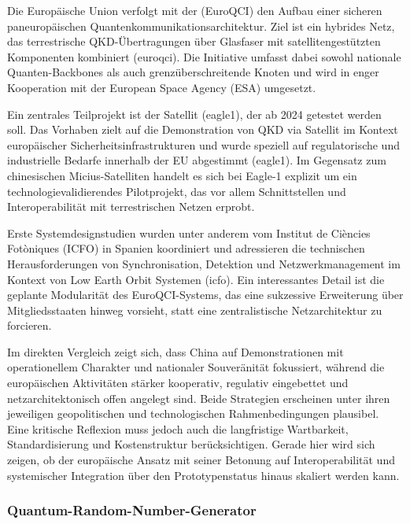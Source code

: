 Die Europäische Union verfolgt mit der (EuroQCI) den Aufbau einer sicheren paneuropäischen Quantenkommunikationsarchitektur. Ziel ist ein hybrides Netz, das terrestrische QKD-Übertragungen über Glasfaser mit satellitengestützten Komponenten kombiniert (euroqci). Die Initiative umfasst dabei sowohl nationale Quanten-Backbones als auch grenzüberschreitende Knoten und wird in enger Kooperation mit der European Space Agency (ESA) umgesetzt.

Ein zentrales Teilprojekt ist der Satellit (eagle1), der ab 2024 getestet werden soll. Das Vorhaben zielt auf die Demonstration von QKD via Satellit im Kontext europäischer Sicherheitsinfrastrukturen und wurde speziell auf regulatorische und industrielle Bedarfe innerhalb der EU abgestimmt (eagle1). Im Gegensatz zum chinesischen Micius-Satelliten handelt es sich bei Eagle-1 explizit um ein technologievalidierendes Pilotprojekt, das vor allem Schnittstellen und Interoperabilität mit terrestrischen Netzen erprobt.

Erste Systemdesignstudien wurden unter anderem vom Institut de Ciències Fotòniques (ICFO) in Spanien koordiniert und adressieren die technischen Herausforderungen von Synchronisation, Detektion und Netzwerkmanagement im Kontext von Low Earth Orbit Systemen (icfo). Ein interessantes Detail ist die geplante Modularität des EuroQCI-Systems, das eine sukzessive Erweiterung über Mitgliedsstaaten hinweg vorsieht, statt eine zentralistische Netzarchitektur zu forcieren.

Im direkten Vergleich zeigt sich, dass China auf Demonstrationen mit operationellem Charakter und nationaler Souveränität fokussiert, während die europäischen Aktivitäten stärker kooperativ, regulativ eingebettet und netzarchitektonisch offen angelegt sind. Beide Strategien erscheinen unter ihren jeweiligen geopolitischen und technologischen Rahmenbedingungen plausibel. Eine kritische Reflexion muss jedoch auch die langfristige Wartbarkeit, Standardisierung und Kostenstruktur berücksichtigen. Gerade hier wird sich zeigen, ob der europäische Ansatz mit seiner Betonung auf Interoperabilität und systemischer Integration über den Prototypenstatus hinaus skaliert werden kann.

\subsubsection{Quantum-Random-Number-Generator}

